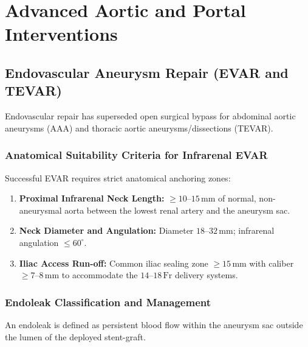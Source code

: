\documentclass[11pt,a4paper]{article}
\begin{document}
\section{Advanced Aortic and Portal Interventions}

\subsection{Endovascular Aneurysm Repair (EVAR and TEVAR)}

Endovascular repair has superseded open surgical bypass for abdominal aortic aneurysms (AAA) and thoracic aortic aneurysms/dissections (TEVAR).

\subsubsection{Anatomical Suitability Criteria for Infrarenal EVAR}
Successful EVAR requires strict anatomical anchoring zones:
\begin{enumerate}[leftmargin=*]
    \item \textbf{Proximal Infrarenal Neck Length:} $\ge 10\text{--}15\,\text{mm}$ of normal, non-aneurysmal aorta between the lowest renal artery and the aneurysm sac.
    \item \textbf{Neck Diameter and Angulation:} Diameter $18\text{--}32\,\text{mm}$; infrarenal angulation $\le 60^\circ$.
    \item \textbf{Iliac Access Run-off:} Common iliac sealing zone $\ge 15\,\text{mm}$ with caliber $\ge 7\text{--}8\,\text{mm}$ to accommodate the $14\text{--}18\,\text{Fr}$ delivery systems.
\end{enumerate}

\subsubsection{Endoleak Classification and Management}
An endoleak is defined as persistent blood flow within the aneurysm sac outside the lumen of the deployed stent-graft.
\end{document}
